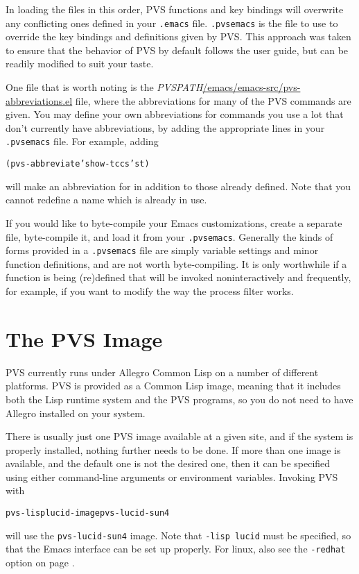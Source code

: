 In loading the files in this order, PVS functions and key
bindings will overwrite any conflicting ones defined in your
\texttt{.emacs} file.  \texttt{.pvsemacs} is the file to use to override
the key bindings and definitions given by PVS.  This approach was taken to
ensure that the behavior of PVS by default follows the user guide, but can
be readily modified to suit your taste.

One file that is worth noting is the
\emph{PVSPATH}\url{/emacs/emacs-src/pvs-abbreviations.el}%
 file, where the
abbreviations for many of the PVS commands are given.  You may define your
own abbreviations for commands you use a lot that don't currently have
abbreviations, by adding the appropriate lines in your \texttt{.pvsemacs}
file.  For example, adding
\begin{alltt}
  (pvs-abbreviate 'show-tccs 'st)
\end{alltt}
will make  an abbreviation for  in addition to
those already defined.  Note that you cannot redefine a name which is
already in use.

If you would like to byte-compile your Emacs customizations, create a
separate file, byte-compile it, and load it from your \texttt{.pvsemacs}.
Generally the kinds of forms provided in a \texttt{.pvsemacs} file are
simply variable settings and minor function definitions, and are not worth
byte-compiling.  It is only worthwhile if a function is being (re)defined
that will be invoked noninteractively and frequently, for example, if you
want to modify the way the process filter works.



\section{The PVS Image}
\label{pvsimage}

PVS currently runs under Allegro Common Lisp on a number of different
platforms.  PVS is provided as a Common Lisp image, meaning that it
includes both the Lisp runtime system and the PVS programs, so you do not
need to have Allegro installed on your system.

There is usually just one PVS image available at a given site, and if the
system is properly installed, nothing further needs to be done.  If more
than one image is available, and the default one is not the desired one,
then it can be specified using either command-line arguments or
environment variables.  Invoking PVS with
{\smaller
\begin{alltt}
  pvs -lisp lucid -image pvs-lucid-sun4
\end{alltt}}
\noindent will use the \texttt{pvs-lucid-sun4} image.  Note that \texttt{-lisp
lucid} must be specified, so that the Emacs interface can be set up
properly.  For linux, also see the {\tt -redhat} option on page
\pageref{dash-redhat}.

